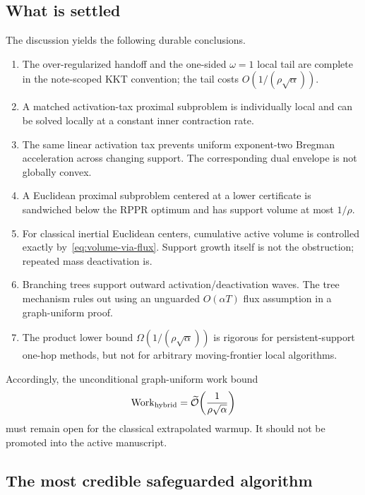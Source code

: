 \subsection{What is settled}

The discussion yields the following durable conclusions.
\begin{enumerate}[label=\arabic*.,leftmargin=*]
  \item The over-regularized handoff and the one-sided $\omega=1$ local tail
  are complete in the note-scoped KKT convention; the tail costs
  $O(1/(\rho\sqrt\alpha))$.
  \item A matched activation-tax proximal subproblem is individually local and
  can be solved locally at a constant inner contraction rate.
  \item The same linear activation tax prevents uniform exponent-two Bregman
  acceleration across changing support.  The corresponding dual envelope is
  not globally convex.
  \item A Euclidean proximal subproblem centered at a lower certificate is
  sandwiched below the RPPR optimum and has support volume at most $1/\rho$.
  \item For classical inertial Euclidean centers, cumulative active volume is
  controlled exactly by~\eqref{eq:volume-via-flux}.  Support growth itself is
  not the obstruction; repeated mass deactivation is.
  \item Branching trees support outward activation/deactivation waves.  The
  tree mechanism rules out using an unguarded $O(\alpha T)$ flux assumption in
  a graph-uniform proof.
  \item The product lower bound
  $\Omega(1/(\rho\sqrt\alpha))$ is rigorous for persistent-support one-hop
  methods, but not for arbitrary moving-frontier local algorithms.
\end{enumerate}

Accordingly, the unconditional graph-uniform work bound
\begin{equation}
  \operatorname{Work}_{\mathrm{hybrid}}
  =\widetilde{\mathcal{O}}\!\left(\frac1{\rho\sqrt\alpha}\right)
  \label{eq:still-open-target}
\end{equation}
must remain open for the classical extrapolated warmup.  It should not be
promoted into the active manuscript.

\subsection{The most credible safeguarded algorithm}

